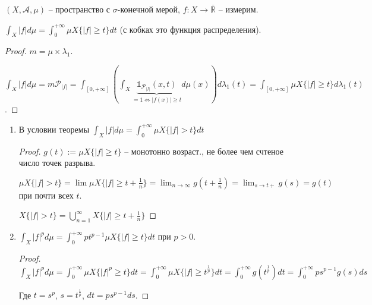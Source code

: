 \begin{theorem}
    $(X, \mathcal{A}, \mu)$ -- пространство с $\sigma$-конечной мерой, $f: X \rightarrow \overline{\mathbb{R}}$ -- измерим.

    $\int_X{|f| d \mu} = \int_{0}^{+\infty} {\mu X \{ |f| \geq t \}}dt$ (с кобках это функция распределения).
\end{theorem}
\begin{proof}
    $m = \mu \times \lambda_{1}$.

    $\int_X{|f| d \mu} = m \mathcal{P}_{|f|} = \int_{[0, +\infty]} {\left(\int_{X} {\underbrace{\mathbb{1}_{\mathcal{P}_{|f|}}(x, t)}_{=1 \Leftrightarrow |f(x)| \geq t} d \mu(x)}\right) d \lambda_1(t)} = \int_{[0, +\infty]}{\mu X \{ |f| \geq t \} d \lambda_1(t)}$.

\end{proof}

\begin{consequence}
    \begin{enumerate}
        \item {
            В условии теоремы $\int_X {|f| d \mu} = \int_{0}^{+\infty} {\mu X\{ |f| > t \}dt}$

            \begin{proof}
                $g(t) := \mu X \{ |f| \geq t \}$ -- монотонно возраст., не более чем счтеное число точек разрыва.

                $\mu X\{ |f| > t \} = \lim{\mu X \{ |f| \geq t+\frac{1}{n} \}} = \lim_{n \rightarrow \infty}{g(t + \frac{1}{n})} = \lim_{s \rightarrow t+}{g(s)} = g(t)$ при почти всех $t$.

                $X \{ |f| > t \} = \bigcup_{n=1}^{\infty} X \{ |f| \geq t + \frac{1}{n} \}$
            \end{proof}
        }
        \item {
            $\int_X {|f|^p d \mu} = \int_{0}^{+\infty} {p t^{p-1} \mu X\{ |f| \geq t \} dt}$ при $p > 0$.

            \begin{proof}
                $\int_X {|f|^p d \mu} = \int_{0}^{+\infty} {\mu X \{ |f|^p \geq t \}dt} = \int_0^{+\infty}{\mu X \{ |f| \geq t^{\frac{1}{p}} \} dt} = \int_{0}^{+\infty}{g (t^{\frac{1}{p}}) dt} = \int_{0}^{+\infty}{p s^{p-1} g(s) ds}$
                
                Где $t = s^p$, $s = t^{\frac{1}{p}}$, $dt = ps^{p-1}ds$.
            \end{proof}
        }
    \end{enumerate}
\end{consequence}
